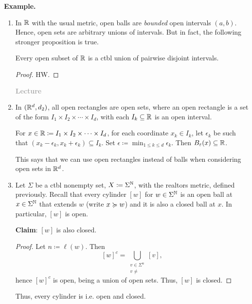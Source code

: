\documentclass[14pt,oneside]{extarticle}
\newcounter{lecture}
\newcommand{\lecture}{%
  \refstepcounter{lecture}%
  \begin{flushright}
    \textcolor{darkgray}{\textbf{Lecture \thelecture}}
  \end{flushright}%
}
\newenvironment{example}{
    \par
    \vspace{5pt}
    \noindent\textbf{Example.}
    \begin{tcolorbox}[
        blanker, breakable, left=5mm, parbox=false,
        before upper={\parindent15pt},
        after skip=10pt,
        borderline west={1mm}{0pt}{solarized-magenta!50}]
}{
    \end{tcolorbox}
    \vspace{5pt}
}
\begin{document}
\begin{example}
  \begin{enumerate}[label=$\circ$, leftmargin=*, itemsep=1em]
    \item In $\mathbb{R}$ with the usual metric, open balls are \textit{bounded} open intervals $(a,b)$. Hence, open sets are arbitrary unions of intervals. But in fact, the following stronger proposition is true.
    
    \begin{proposition*}
      Every open subset of $\mathbb{R}$ is a ctbl union of pairwise disjoint intervals.
    \end{proposition*}
    \begin{proof}
      HW.
    \end{proof}

    \lecture
    
    \item In $(\mathbb{R}^d, d_2)$, all open rectangles are open sets, where an open rectangle is a set of the form $I_1 \times I_2 \times \cdots \times I_d$, with each $I_k \subseteq \mathbb{R}$ is an open interval.
    
    \noindent\soln{} For $x \in \mathbb{R} \coloneqq I_1 \times I_2 \times \cdots \times I_d$, for each coordinate $x_k \in I_k$, let $\epsilon_k$ be such that $(x_k - \epsilon_k, x_k + \epsilon_k) \subseteq I_k$. Set $\epsilon \coloneqq \min_{1 \leq k \leq d} \epsilon_k$. Then $B_\varepsilon(x) \subseteq \mathbb{R}$.

    \pic

    This says that we can use open rectangles instead of balls when considering open sets in $\mathbb{R}^d$.

    \item Let $\Sigma$ be a ctbl nonempty set, $X \coloneqq \Sigma^{\mathbb{N}}$, with the realtors metric, defined previously. Recall that every cylinder $[w]$ for $w \in \Sigma^{\mathbb{N}}$ is an open ball at $x \in \Sigma^{\mathbb{N}}$ that extends $w$ (write $x \succcurlyeq w$) and it is also a closed ball at $x$. In particular, $[w]$ is open.
    
    \textbf{Claim}: $[w]$ is also closed.
    \begin{proof}
      Let $n \coloneqq \ell(w)$. Then 
      \[[w]^c = \bigcup_{\substack{v \in \Sigma^n \\ v \neq }} [v],\]
      hence $[w]^c$ is open, being a union of open sets. Thus, $[w]$ is closed.
    \end{proof}
    Thus, every cylinder is  i.e. open and closed.
  \end{enumerate}
\end{example}
\end{document}
